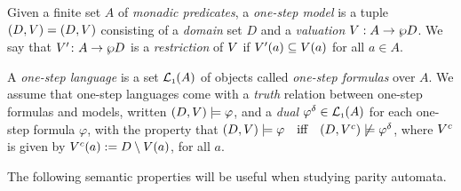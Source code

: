 \begin{definition}\label{def:one-step}
Given a finite set $A$ of \emph{monadic predicates}, a \emph{one-step model} is a tuple $(D, V) = (D,V)$
consisting of a \emph{domain} set $D$ and a \emph{valuation} $V : A \to \wp D$. We say that $V' \colon A \to \wp D$ is a \emph{restriction} of $V$ if $V'(a) \subseteq V(a)$ for all $a\in A$.


A \emph{one-step language} is a set $\mathcal{L}_{\scriptscriptstyle 1}(A)$ of objects called \emph{one-step formulas} over $A$. We assume that one-step languages come with a \emph{truth} relation between one-step formulas and models, written $(D, V) \models \varphi$, and a \emph{dual} $\varphi^{\delta} \in \mathcal{L}_{\scriptscriptstyle 1}(A)$ for each one-step formula $\varphi$, with the property that $(D,\val) \models \varphi\quad \text{iff}\quad (D,\val^{c}) \not\models \varphi^{\delta}$, where $V^{c}$ is given by $V^{c}(a) \mathrel{:=} D \setminus V(a)$, for all $a$.
\end{definition}

The following semantic properties will be useful when studying parity automata.

